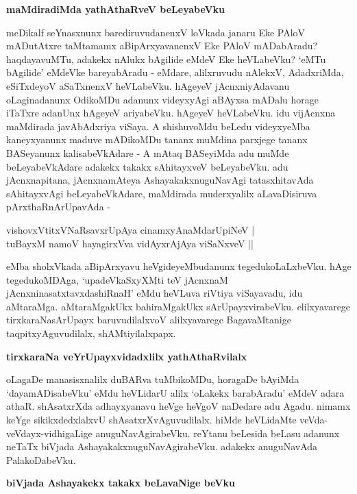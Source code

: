 {\bigskip
\noindent
{\large\bf maMdiradiMda yathAthaRveV beLeyabeVku}}\label{page69}
\medskip

\noindent
meDikalf seYnasxnunx barediruvudanenxV loVkada janaru Eke PAloV mADutAtxre taMtamamx aBipArxyavanenxV Eke PAloV mADabAradu? haqdayavuMTu, adakekx nAlukx bAgilide eMdeV Eke heVLabeVku? `eMTu bAgilide' eMdeVke bareyabAradu - eMdare, alilxruvudu nAlekxV, AdadxriMda, eSiTxdeyoV aSaTxnenxV heVLabeVku. hAgeyeV jAcnxniyAdavanu oLaginadanunx OdikoMDu adanunx videyxyAgi aBAyxsa mADalu horage iTaTxre adanUnx hAgeyeV ariyabeVku. hAgeyeV heVLabeVku. idu vijAcnxna maMdirada javAbAdxriya viSaya. A shishuvoMdu beLedu videyxyeMba kaneyxyanunx maduve mADikoMDu tananx muMdina parxjege tananx BASeyanunx kalisabeVkAdare - A mAtaq BASeyiMda adu muMde beLeyabeVkAdare adakekx takakx sAhitayxveV beLeyabeVku. adu jAcnxnapitana, jAcnxnamAteya AshayakakxnuguNavAgi tatasxhitavAda sAhitayxvAgi beLeyabeVkAdare, maMdirada muderxyalilx aLavaDisiruva pArxthaRnArUpavAda -

\begin{shloka}
vishovxVtitxVNaRsavxrUpAya cinamxyAnaMdarUpiNeV |\\\label{69}
tuBayxM namoV hayagirxVva vidAyxrAjAya viSaNxveV ||
\end{shloka}

\noindent
eMba sholxVkada aBipArxyavu heVgideyeMbudanunx tegedukoLaLxbeVku. hAge tegedukoMDAga, `upadeVkaSxyXMti teV jAcnxnaM\label{69a} jAcnxninasatxtavxdashiRnaH' eMdu heVLuva riVtiya viSayavadu, idu aMtaraMga. aMtaraMgakUkx bahiraMgakUkx sArUpayxvirabeVku. elilxyavarege tirxkaraNasArUpayx baruvudilalxvoV alilxyavarege BagavaMtanige taqpitxyAguvudilalx, shAMtiyilalxpapx.

{\bigskip
\noindent
{\large\bf tirxkaraNa veYrUpayxvidadxlilx yathAthaRvilalx}}\label{page69a}
\medskip

\noindent
oLagaDe manasisxnalilx duBARva tuMbikoMDu, horagaDe bAyiMda `dayamADisabeVku' eMdu heVLidarU alilx `oLakekx barabAradu' eMdeV adara athaR. shAsatxrXda adhayxyanavu heVge heVgoV naDedare adu Agadu. nimamx keYge sikikxdedxlalxvU shAsatxrXvAguvudilalx. hiMde heVLidaMte veVda-veVdayx-vidhigaLige anuguNavAgirabeVku. reYtanu beLesida beLasu adanunx neTaTx biVjada AshayakakxnuguNavAgirabeVku. adakekx anuguNavAda PalakoDabeVku.

{\bigskip
\noindent
{\large\bf biVjada Ashayakekx takakx beLavaNige beVku}}\label{page70}
\medskip

